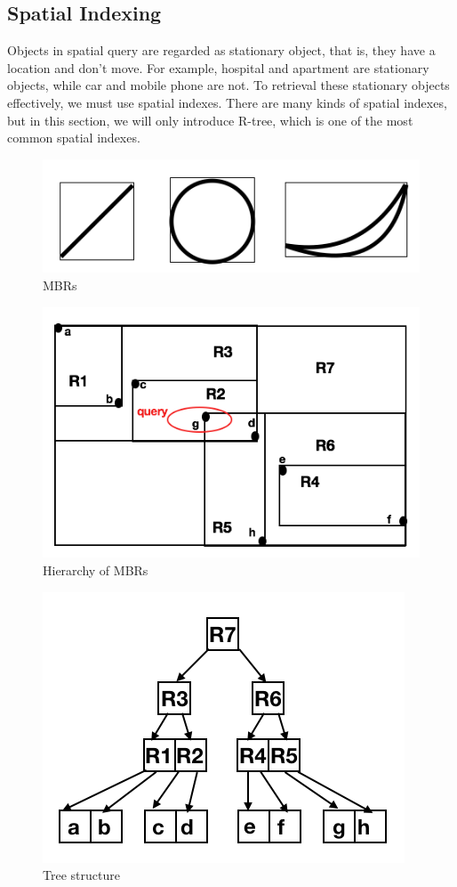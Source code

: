 \subsection{Spatial Indexing}\label{spatial_index}
Objects in spatial query are regarded as stationary object, that is, they have a location and
don't move. For example, hospital and apartment are stationary objects, while car and mobile
phone are not. To retrieval these stationary objects effectively, we must use spatial
indexes. There are many kinds of spatial indexes, but in this section, we will only introduce R-tree,
which is one of the most common spatial indexes.

\begin{figure}[htp]
  \centering
  \includegraphics[width=.8\linewidth]{pic/mbr.PNG}
  \caption{MBRs}
\label{mbr}
\end{figure}

\begin{figure}[htp]
  \centering
  \includegraphics[width=0.8\linewidth]{pic/hierarchy_mbr.PNG}
  \caption{Hierarchy of MBRs}
\label{hierarchy_mbr}
\end{figure}

\begin{figure}[htp]
  \centering
  \includegraphics[width=0.8\linewidth]{pic/rtree.PNG}
  \caption{Tree structure}
\label{rtree}
\end{figure}

